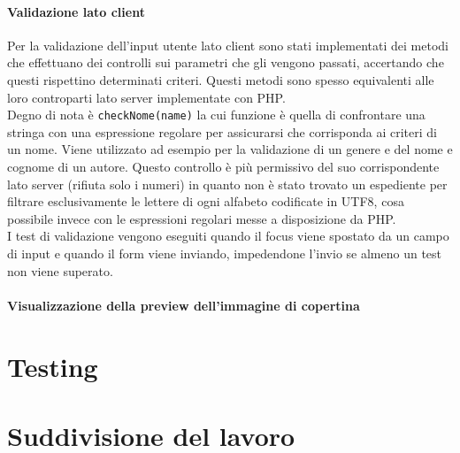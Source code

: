 \documentclass[12pt,a4paper,headings=optiontohead]{article}
\begin{document}
\paragraph{Validazione lato client}
Per la validazione dell'input utente lato client sono stati implementati dei metodi che effettuano dei controlli sui parametri che gli vengono passati, accertando che questi rispettino determinati criteri. Questi metodi sono spesso equivalenti alle loro controparti lato server implementate con PHP. \\
Degno di nota è \texttt{checkNome(name)} la cui funzione è quella di confrontare una stringa con una espressione regolare per assicurarsi che corrisponda ai criteri di un nome. Viene utilizzato ad esempio per la validazione di un genere e del nome e cognome di un autore. Questo controllo è più permissivo del suo corrispondente lato server (rifiuta solo i numeri) in quanto non è stato trovato un espediente per filtrare esclusivamente le lettere di ogni alfabeto codificate in UTF8, cosa possibile invece con le espressioni regolari messe a disposizione da PHP.\\
I test di validazione vengono eseguiti quando il focus viene spostato da un campo di input e quando il form viene inviando, impedendone l'invio se almeno un test non viene superato.

\paragraph{Visualizzazione della preview dell'immagine di copertina} %

\section{Testing}

\section{Suddivisione del lavoro}
\end{document}
